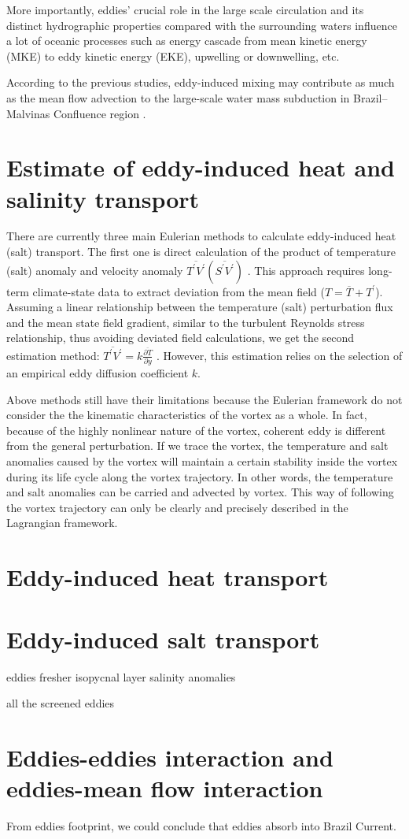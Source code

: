 More importantly, eddies' crucial role in the large scale circulation and its distinct hydrographic properties compared with the surrounding waters influence a lot of oceanic processes such as energy cascade from mean kinetic energy (MKE) to eddy kinetic energy (EKE), upwelling or downwelling, etc.

According to the previous studies, eddy-induced mixing may contribute as much as the mean flow advection to the large-scale water mass subduction in Brazil–Malvinas Confluence region \cite{marshall2006estimates}.

\section{Estimate of eddy-induced heat and salinity transport}

There are currently three main Eulerian methods to calculate eddy-induced heat (salt) transport. The first one is direct calculation of the product of temperature (salt) anomaly and velocity anomaly $\overline{T^{\prime} V^{\prime}}\left(\overline{S^{\prime} V^{\prime}}\right)$ \cite{volkov2008eddy}. This approach requires long-term climate-state data to extract deviation from the mean field ($T = \overline{T}+ T^{\prime}$). Assuming a linear relationship between the temperature (salt) perturbation flux and the mean state field gradient, similar to the turbulent Reynolds stress relationship, thus avoiding deviated field calculations, we get the second estimation method: $\overline{T^{\prime} V^{\prime}} =k \frac{\overline{\partial T}}{\partial y}$ \cite{stammer1998eddy,chen2012eddy}. However, this estimation relies on the selection of an empirical eddy diffusion coefficient $k$.

Above methods still have their limitations because the Eulerian framework do not consider the the kinematic characteristics of the vortex as a whole. In fact, because of the highly nonlinear nature of the vortex, coherent eddy is different from the general perturbation. If we trace the vortex, the temperature and salt anomalies caused by the vortex will maintain a certain stability inside the vortex during its life cycle along the vortex trajectory. In other words, the temperature and salt anomalies can be carried and advected by vortex. This way of following the vortex trajectory can only be clearly and precisely described in the Lagrangian framework.


\section{Eddy-induced heat transport}

\section{Eddy-induced salt transport}

eddies fresher isopycnal layer salinity anomalies

all the screened eddies

\section{Eddies-eddies interaction and eddies-mean flow interaction}

From eddies footprint, we could conclude that eddies absorb into Brazil Current.

\newpage
